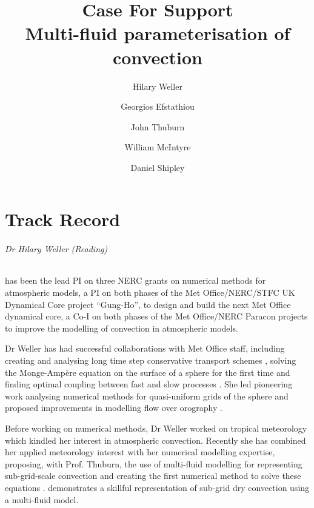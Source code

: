 \documentclass[11pt,a4paper]{article}
\begin{document}
\title{Case For Support \\ \Large
Multi-fluid parameterisation of convection
}
\author{Hilary Weller \and Georgios Efstathiou \and John Thuburn \and William McIntyre \and Daniel Shipley}
\date{}
\maketitle

\part{Track Record}

\paragraph*{Dr Hilary Weller (Reading)} has been the lead PI on three NERC grants on numerical methods for atmospheric models, a PI on both phases of the Met Office/NERC/STFC UK Dynamical Core project ``Gung-Ho'', to design and build the next Met Office dynamical core, a Co-I on both phases of the Met Office/NERC Paracon projects to improve the modelling of convection in atmospheric models.

Dr Weller has had successful collaborations with Met Office staff, including creating and analysing long time step conservative transport schemes \cite[]{CWPS17,SWMD17}, solving the Monge-Amp\`ere equation on the surface of a sphere for the first time \cite[]{WBBC16} and finding optimal coupling between fast and slow processes \cite[][]{WLW13}. She led pioneering work analysing numerical methods for quasi-uniform grids of the sphere \cite[e.g.][]{WWF09,Wel12,WTC12} and proposed improvements in modelling flow over orography \cite[]{WS14}. 

Before working on numerical methods, Dr Weller worked on tropical meteorology \cite[e.g.][]{LGWS09} which kindled her interest in atmospheric convection. Recently she has combined her applied meteorology interest with her numerical modelling expertise, proposing, with Prof. Thuburn, the use of multi-fluid modelling for representing sub-grid-scale convection \cite[]{TWV+18} and creating the first numerical method to solve these equations \cite[]{WM19}. \cite[]{WMS20} demonstrates a skillful representation of sub-grid dry convection using a multi-fluid model.
\end{document}

